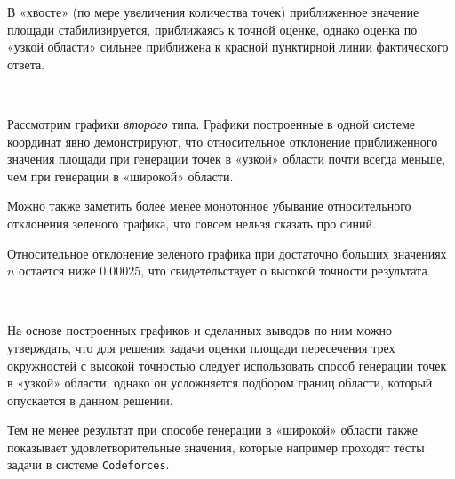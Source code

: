 \documentclass[11pt,a4paper]{scrarticle}
\theoremstyle{definition}
\begin{document}
В «хвосте» (по мере увеличения количества точек) приближенное значение площади стабилизируется, приближаясь к точной оценке, однако оценка по «узкой области» сильнее приближена к красной пунктирной линии фактического ответа.

\

Рассмотрим графики \emph{второго} типа. Графики построенные в одной системе координат явно демонстрируют, что относительное отклонение приближенного значения площади при генерации точек в «узкой» области почти всегда меньше, чем при генерации в «широкой» области.

Можно также заметить более менее монотонное убывание относительного отклонения зеленого графика, что совсем нельзя сказать про синий.

Относительное отклонение зеленого графика при достаточно больших значениях $n$ остается ниже $0.00025$, что свидетельствует о высокой точности результата.

\

На основе построенных графиков и сделанных выводов по ним можно утверждать, что для решения задачи оценки площади пересечения трех окружностей с высокой точностью следует использовать способ генерации точек в «узкой» области, однако он усложняется подбором границ области, который опускается в данном решении.

Тем не менее результат при способе генерации в «широкой» области также показывает удовлетворительные значения, которые например проходят тесты задачи в системе \texttt{Codeforces}.
\end{document}
